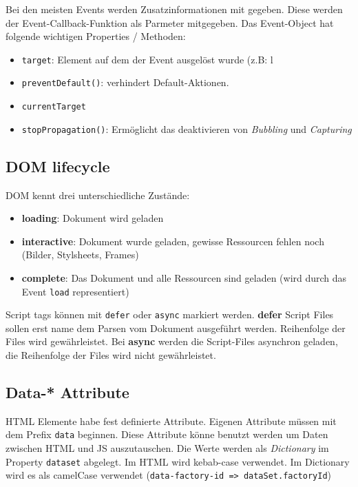 \documentclass[11pt,twoside,landscape]{article}
\begin{document}
\begin{multicols}{4}
Bei den meisten Events werden Zusatzinformationen mit gegeben. Diese werden der Event-Callback-Funktion als Parmeter mitgegeben. Das Event-Object hat folgende wichtigen Properties / Methoden: 
\begin{itemize}
\item \texttt{target}: Element auf dem der Event ausgelöst wurde (z.B: l
\item \texttt{preventDefault()}: verhindert Default-Aktionen.
\item \texttt{currentTarget}
\item \texttt{stopPropagation()}: Ermöglicht das deaktivieren von \emph{Bubbling} und \emph{Capturing}
\end{itemize}

\subsection*{DOM lifecycle}
\label{sec:orgd6bcef9}
DOM kennt drei unterschiedliche Zustände: 
\begin{itemize}
\item \textbf{loading}: Dokument wird geladen
\item \textbf{interactive}: Dokument wurde geladen, gewisse Ressourcen fehlen noch (Bilder, Stylsheets, Frames)
\item \textbf{complete}: Das Dokument und alle Ressourcen sind geladen (wird durch das Event \texttt{load} representiert)
\end{itemize}

Script tags können mit \texttt{defer} oder \texttt{async} markiert werden. \textbf{defer} Script Files sollen erst name dem Parsen vom Dokument ausgeführt werden. Reihenfolge der Files wird gewährleistet. Bei \textbf{async} werden die Script-Files asynchron geladen, die Reihenfolge der Files wird nicht gewährleistet.

\subsection*{Data-* Attribute}
\label{sec:orgb2ab0a2}
HTML Elemente habe fest definierte Attribute. Eigenen Attribute müssen mit dem Prefix \texttt{data} beginnen. Diese Attribute könne benutzt werden um Daten zwischen HTML und JS auszutauschen. Die Werte werden als \emph{Dictionary} im Property \texttt{dataset} abgelegt. Im HTML wird kebab-case verwendet. Im Dictionary wird es als camelCase verwendet (\texttt{data-factory-id => dataSet.factoryId})


\end{multicols}
\end{document}
